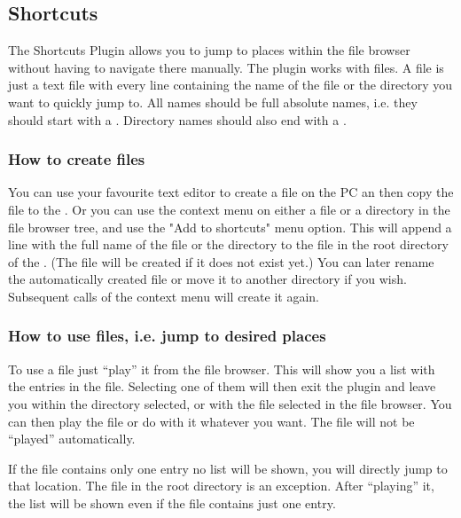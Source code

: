 \subsection{Shortcuts}

The Shortcuts Plugin allows you to jump to places within the file browser
without having to navigate there manually. The plugin works with
 files. A  file is just a text file with every
line containing the name of the file or the directory you want to quickly
jump to. All names should be full absolute names, i.e. they should start
with a \fname{/}. Directory names should also end with a \fname{/}.

\subsubsection{How to create  files}

You can use your favourite text editor to create a  file on the
PC an then copy the file to the \dap{}. Or you can use the context menu on
either a file or a directory in the file browser tree, and use the "Add to
shortcuts" menu option. This will append a line with the full name of the
file or the directory to the  file in the root
directory of the \dap{}. (The file will be created if it does not exist
yet.) You can later rename the automatically created 
file or move it to another directory if you wish. Subsequent calls of the
context menu will create it again.


\subsubsection{How to use  files, i.e. jump to desired places}

To use a  file just ``play'' it from the file browser. This will
show you a list with the entries in the file. Selecting one of them will
then exit the plugin and leave you within the directory selected, or with
the file selected in the file browser. You can then play the file or do
with it whatever you want. The file will not be ``played'' automatically.

If the  file contains only one entry no list will be shown, you
will directly jump to that location. The file  in the
root directory is an exception. After ``playing'' it, the list will be shown
even if the file contains just one entry.

